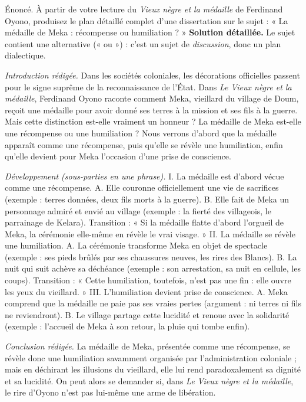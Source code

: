 \documentclass[11pt]{article}
\newcommand{\cle}[1]{{\popxbold\color{popdark}#1}}
\begin{document}
\begin{exoresolu}
Énoncé. À partir de votre lecture du \emph{Vieux nègre et la médaille} de Ferdinand Oyono, produisez le plan détaillé complet d'une dissertation sur le sujet : « La médaille de Meka : récompense ou humiliation ? »
\tcblower
\textbf{Solution détaillée.} Le sujet contient une alternative (« ou ») : c'est un sujet de \emph{discussion}, donc un \cle{plan dialectique}.

\emph{Introduction rédigée.} Dans les sociétés coloniales, les décorations officielles passent pour le signe suprême de la reconnaissance de l'État. Dans \emph{Le Vieux nègre et la médaille}, Ferdinand Oyono raconte comment Meka, vieillard du village de Doum, reçoit une médaille pour avoir donné ses terres à la mission et ses fils à la guerre. Mais cette distinction est-elle vraiment un honneur ? La médaille de Meka est-elle une récompense ou une humiliation ? Nous verrons d'abord que la médaille apparaît comme une récompense, puis qu'elle se révèle une humiliation, enfin qu'elle devient pour Meka l'occasion d'une prise de conscience.

\emph{Développement (sous-parties en une phrase).}
I. La médaille est d'abord vécue comme une récompense.
\quad A. Elle couronne officiellement une vie de sacrifices (exemple : terres données, deux fils morts à la guerre).
\quad B. Elle fait de Meka un personnage admiré et envié au village (exemple : la fierté des villageois, le parrainage de Kelara).
Transition : « Si la médaille flatte d'abord l'orgueil de Meka, la cérémonie elle-même en révèle le vrai visage. »
II. La médaille se révèle une humiliation.
\quad A. La cérémonie transforme Meka en objet de spectacle (exemple : ses pieds brûlés par ses chaussures neuves, les rires des Blancs).
\quad B. La nuit qui suit achève sa déchéance (exemple : son arrestation, sa nuit en cellule, les coups).
Transition : « Cette humiliation, toutefois, n'est pas une fin : elle ouvre les yeux du vieillard. »
III. L'humiliation devient prise de conscience.
\quad A. Meka comprend que la médaille ne paie pas ses vraies pertes (argument : ni terres ni fils ne reviendront).
\quad B. Le village partage cette lucidité et renoue avec la solidarité (exemple : l'accueil de Meka à son retour, la pluie qui tombe enfin).

\emph{Conclusion rédigée.} La médaille de Meka, présentée comme une récompense, se révèle donc une humiliation savamment organisée par l'administration coloniale ; mais en déchirant les illusions du vieillard, elle lui rend paradoxalement sa dignité et sa lucidité. On peut alors se demander si, dans \emph{Le Vieux nègre et la médaille}, le rire d'Oyono n'est pas lui-même une arme de libération.
\end{exoresolu}
\end{document}

